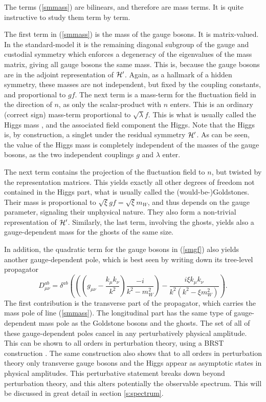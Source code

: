 \documentclass[final,twoside,12pt]{article}
\newcommand*{\no}{\noindent}
\newcommand*{\be}{\begin{equation}}
\newcommand*{\ee}{\end{equation}}
\newcommand*{\pref}[1]{(\ref{#1})}
\newcommand*{\mn}{{\mu\nu}}
\newcommand*{\1}{1\!\!\!\bot}
\begin{document}
The terms \pref{smmass} are bilinears, and therefore are mass terms. It is quite instructive to study them term by term.

The first term in \pref{smmass} is the mass of the gauge bosons. It is matrix-valued. In the standard-model it is the remaining diagonal subgroup of the gauge and custodial symmetry which enforces a degeneracy of the eigenvalues of the mass matrix, giving all gauge bosons the same mass. This is, because the gauge bosons are in the adjoint representation of ${\cal H}'$. Again, as a hallmark of a hidden symmetry, these masses are not independent, but fixed by the coupling constants, and proportional to $gf$. The next term is a mass-term for the fluctuation field in the direction of $n$, as only the scalar-product with $n$ enters. This is an ordinary (correct sign) mass-term proportional to $\sqrt{\lambda}f$. This is what is usually called the Higgs mass \cite{pdg,Bohm:2001yx}, and the associated field component the Higgs. Note that the Higgs is, by construction, a singlet under the residual symmetry ${\cal H}'$. As can be seen, the value of the Higgs mass is completely independent of the masses of the gauge bosons, as the two independent couplings $g$ and $\lambda$ enter.

The next term contains the projection of the fluctuation field to $n$, but twisted by the representation matrices. This yields exactly all other degrees of freedom not contained in the Higgs part, what is usually called the (would-be-)Goldstones. Their mass is proportional to $\sqrt{\xi}gf=\sqrt{\xi}m_W$, and thus depends on the gauge parameter, signaling their unphysical nature. They also form a non-trivial representation of ${\cal H}'$. Similarly, the last term, involving the ghosts, yields also a gauge-dependent mass for the ghosts of the same size.

In addition, the quadratic term for the gauge bosons in \pref{smgf} also yields another gauge-dependent pole, which is best seen by writing down its tree-level propagator \cite{Bohm:2001yx}
\be
D_\mn^{ab}=\delta^{ab}\left(\left(\left(g_\mn-\frac{k_\mu k_\nu}{k^2}\right)\frac{-i}{k^2-m_W^2}\right)-\frac{i\xi k_\mu k_\nu}{k^2(k^2-\xi m_W^2)}\right)\label{wprop}.
\ee
\no The first contribution is the transverse part of the propagator, which carries the mass pole of line \pref{smmass}. The longitudinal part has the same type of gauge-dependent mass pole as the Goldstone bosons and the ghosts. The set of all of these gauge-dependent poles cancel in any perturbatively physical amplitude. This can be shown to all orders in perturbation theory, using a BRST construction \cite{Bohm:2001yx,DePalma:2013kua}. The same construction also shows that to all orders in perturbation theory only transverse gauge bosons and the Higgs appear as asymptotic states in physical amplitudes. This perturbative statement breaks down beyond perturbation theory, and this alters potentially the observable spectrum. This will be discussed in great detail in section \ref{s:spectrum}.
\end{document}
